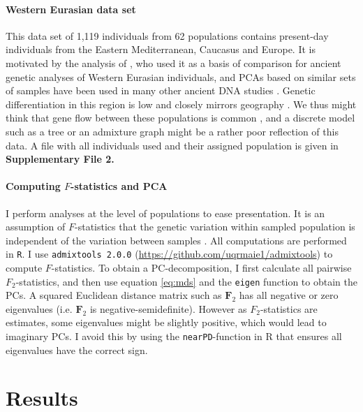 \documentclass[12pt,fullpage, a4paper]{article}
\newcommand{\MF}{\mathbf{F}_2} %
\begin{document}
\paragraph{Western Eurasian data set}
This data set of 1,119 individuals from 62 populations contains  present-day individuals from the Eastern Mediterranean, Caucasus and Europe. It is motivated by the analysis of \cite{lazaridis2014}, who used it as a basis of comparison for ancient genetic analyses of Western Eurasian individuals, and PCAs based on similar sets of samples have been used in many other ancient DNA studies \citep[e.g.][]{lazaridis2016, haak2015}. Genetic differentiation in this region is low and closely mirrors geography \citep{novembre2008}. We thus might think that gene flow between these populations is common \citep{ralph2013}, and a discrete model such as a tree or an admixture graph might be a rather poor reflection of this data. A file with all individuals used and their assigned population is given in \textbf{Supplementary File 2.}


\paragraph{Computing $F$-statistics and PCA}
I perform analyses at the level of populations to ease presentation.  It is an assumption of $F$-statistics that the genetic variation within sampled population is independent of the variation between samples \citep{patterson2012}. All computations are performed in \texttt{R}. I use \texttt{admixtools 2.0.0} (\url{https://github.com/uqrmaie1/admixtools}) to compute $F$-statistics. To obtain a PC-decomposition, I first calculate all pairwise $F_2$-statistics, and then use equation \ref{eq:mds} and the \texttt{eigen} function to obtain the PCs. A squared Euclidean distance matrix such as $\MF$ has all negative or zero eigenvalues (i.e. $\MF$ is negative-semidefinite). However as $F_2$-statistics are estimates, some eigenvalues might be slightly positive, which would lead to imaginary PCs. I avoid this by using the \texttt{nearPD}-function in R that ensures all eigenvalues have the correct sign.

\section{Results}
\end{document}
